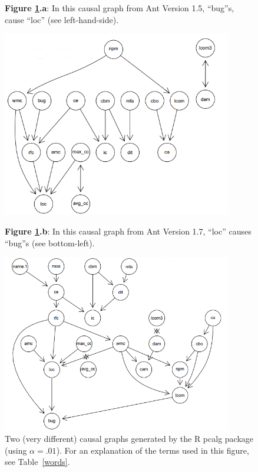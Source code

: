 \documentclass[]{svjour3}
\begin{document}
\begin{figure}
\begin{center}\small
{\bf Figure \ref{cause1}.a}: In this
causal graph from Ant Version 1.5,       ``bug''s,   cause ``loc'' (see left-hand-side).
\vspace{4mm}


\includegraphics[width=10cm]{images/ANT_1.5_Graph.png}

\vspace{4mm}
 
{\bf Figure \ref{cause1}.b}: In this causal graph from  Ant Version 1.7, ``loc'' causes ``bug''s (see bottom-left).

\vspace{4mm}

\includegraphics[width=10cm]{images/ANT_1.7_Graph.png}
\vspace{4mm}
\end{center}
\caption{Two (very different) causal graphs generated by the R pcalg package  (using \(\alpha = .01\)). For an explanation of the terms used in this figure, see Table~\ref{words}.}\label{cause1}
\end{figure} 
\end{document}
